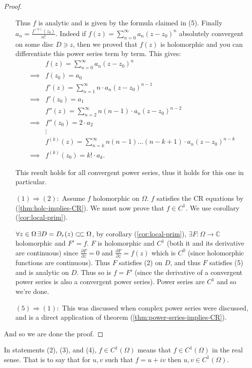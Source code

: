 \begin{proof}
\begin{enumerate}
Thus $f$ is analytic and is given by the formula claimed in (5). Finally $a_n = \frac{f^{(n)} (z_0)}{n!}$. Indeed if $f(z) = \sum_{n=0}^\infty a_n (z-z_0)^n$ absolutely convergent on some disc $D \ni z$, then we proved that $f(z)$ is holomorphic and you can differentiate this power series term by term. This gives:
\begin{align*}
    &f(z) = \sum_{n=0}^\infty a_n (z-z_0)^n\\
    \implies &f(z_0) = a_0\\
    &f'(z) = \sum_{n=1}^\infty n \cdot a_n (z-z_0)^{n-1}\\
    \implies &f'(z_0) = a_1\\
    &f''(z) = \sum_{n=2}^\infty n(n-1) \cdot a_n (z-z_0)^{n-2}\\
    \implies &f''(z_0) = 2\cdot a_2\\
    &\vdots \\
    &f^{(k)}(z) = \sum_{n=k}^\infty n(n-1)\hdots(n-k+1) \cdot a_n (z-z_0)^{n-k}\\
    \implies &f^{(k)}(z_0) = k! \cdot a_k.
\end{align*}

This result holds for all convergent power series, thus it holds for this one in particular.
    
\item[$(1) \Rightarrow (2):$] Assume $f$ holomorphic on $\Omega$. $f$ satisfies the CR equations by (\ref{thm:holc-implies-CR}). We must now prove that $f \in C^1$. We use corollary (\ref{cor:local-prim}).

$\forall z \in \Omega \, \exists D = D_r(z) \ssubset \Omega$, by corollary (\ref{cor:local-prim}), $\exists F: \Omega \rightarrow \mathbb{C}$ holomorphic and $F' = f$. $F$ is holomorphic and $C^1$ (both it and its derivative are continuous) since $\frac{\partial F}{ \partial \overline{z}} =0$ and $\frac{\partial F}{ \partial z} =f(z)$ which is $C^0$ (since holomorphic functions are continuous). Thus $F$ satisfies (2) on $D$, and thus $F$ satisfies (5) and is analytic on $D$. Thus so is $f= F'$ (since the derivative of a convergent power series is also a convergent power series). Power series are $C^1$ and so we're done.
   
   
\item[$(5) \Rightarrow (1):$] This was discussed when complex power series were discussed, and is a direct application of theorem (\ref{thm:power-series-implies-CR}).
    
    
\end{enumerate}

And so we are done the proof.
\end{proof} 


\begin{note}
In statements (2), (3), and (4), $f\in C^1(\Omega)$ means that $f\in C^1(\Omega)$ in the real sense. That is to say that for $u,v$ such that $f=u+iv$ then $u,v \in C^1(\Omega)$.
\end{note}